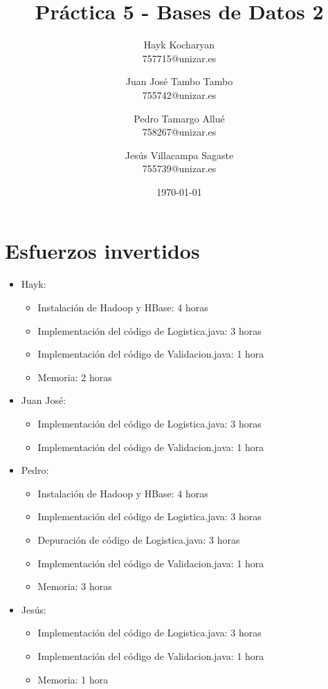 \documentclass[11pt,a4paper]{article}
\begin{document}
\begin{titlepage}
	\title{{\Huge \textbf{Práctica 5 - Bases de Datos 2}}}
	\author{
	  Hayk Kocharyan\\
	  757715@unizar.es
	  \and
	  Juan José Tambo Tambo\\
	  755742@unizar.es
	  \and
	  Pedro Tamargo Allué\\
	  758267@unizar.es
	  \and
	  Jesús Villacampa Sagaste\\
	  755739@unizar.es
	}
	\date{\today}
	
	\clearpage\maketitle
	\thispagestyle{empty}
	\tableofcontents
	\listoffigures
\end{titlepage}

\section{Esfuerzos invertidos}

\begin{itemize}
\item Hayk:
	\begin{itemize}
	\item Instalación de Hadoop y HBase: 4 horas
	\item Implementación del código de Logistica.java: 3 horas
	\item Implementación del código de Validacion.java: 1 hora 
	\item Memoria: 2 horas
	\end{itemize}
\item Juan José:
	\begin{itemize}
	\item Implementación del código de Logistica.java: 3 horas
	\item Implementación del código de Validacion.java: 1 hora
	\end{itemize}
\item Pedro:
	\begin{itemize}
	\item  Instalación de Hadoop y HBase: 4 horas
	\item  Implementación del código de Logistica.java: 3 horas
	\item  Depuración de código de Logistica.java: 3 horas
	\item Implementación del código de Validacion.java: 1 hora
	\item Memoria: 3 horas
	\end{itemize}
\item Jesús:
	\begin{itemize}
	\item  Implementación del código de Logistica.java: 3 horas
	\item Implementación del código de Validacion.java: 1 hora
	\item Memoria: 1 hora
	\end{itemize}
\end{itemize}
\end{document}
